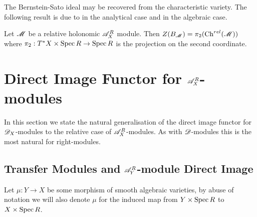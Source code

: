 The Bernstein-Sato ideal may be recovered from the characteristic variety.
The following result is due to \cite{maisonobe2016filtration} in the analytical case and \cite{budur2019zero} in the algebraic case.
\begin{proposition}\label{prop: ProjectionBernsteinSatoRelativeChar}
  Let $\mathscr{M}$ be a relative holonomic $\mathscr{A}_X^R$ module. Then  $Z(B_{\mathscr{M}}) = \pi_2(\operatorname{Ch}^{rel}(\mathscr{M}))$ where $\pi_2:T^*X\times \operatorname{Spec} R \to \operatorname{Spec} R$ is the projection on the second coordinate.
\end{proposition}

\section{Direct Image Functor for $\mathscr{A}_X^R$-modules}
    In this section we state the natural generalisation of the direct image functor for $\mathscr{D}_X$-modules to the relative case of $\mathscr{A}_X^R$-modules. As with $\mathscr{D}$-modules this is the most natural for right-modules.

    \subsection{Transfer Modules and $\mathscr{A}_Y^R$-module Direct Image}
    Let $\mu:Y\to X$ be some morphism of smooth algebraic varieties, by abuse of notation we will also denote $\mu$ for the induced map from $Y\times \operatorname{Spec} R$ to $X\times \operatorname{Spec} R$.

